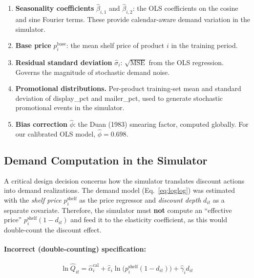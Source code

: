 \documentclass[12pt,a4paper]{article}
\begin{document}
\begin{enumerate}
\item \textbf{Seasonality coefficients}
$\hat{\beta}_{i,1}$ and $\hat{\beta}_{i,2}$: the OLS coefficients
on the cosine and sine Fourier terms. These provide calendar-aware
demand variation in the simulator.

\item \textbf{Base price} $p_i^{\text{base}}$: the mean shelf price
of product $i$ in the training period.

\item \textbf{Residual standard deviation} $\hat{\sigma}_i$:
$\sqrt{\text{MSE}}$ from the OLS regression. Governs the magnitude of
stochastic demand noise.

\item \textbf{Promotional distributions.} Per-product training-set
mean and standard deviation of display\_pct and mailer\_pct, used
to generate stochastic promotional events in the simulator.

\item \textbf{Bias correction} $\hat{\phi}$: the Duan (1983)
smearing factor, computed globally. For our calibrated OLS model,
$\hat{\phi} = 0.698$.
\end{enumerate}

\subsection{Demand Computation in the Simulator}
\label{sec:demand-computation}

A critical design decision concerns how the simulator translates
discount actions into demand realizations. The demand model
(Eq.~\ref{eq:loglog}) was estimated with the \emph{shelf price}
$p_i^{\text{shelf}}$ as the price regressor and \emph{discount depth}
$d_{it}$ as a separate covariate. Therefore, the simulator must
\textbf{not} compute an ``effective price''
$p_i^{\text{shelf}} (1 - d_{it})$ and feed it to the elasticity
coefficient, as this would double-count the discount effect.

\paragraph{Incorrect (double-counting) specification:}
\begin{equation}
\tag{wrong}
\ln \hat{Q}_{it} = \hat{\alpha}_i^{\text{cal}}
+ \hat{\varepsilon}_i \ln\bigl(p_i^{\text{shelf}} (1 - d_{it})\bigr)
+ \hat{\gamma}_i d_{it}
\end{equation}
\end{document}
